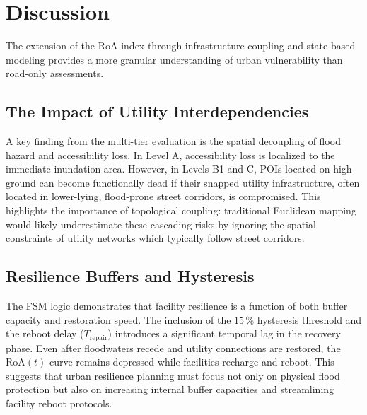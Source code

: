 
\newpage

\section{Discussion}
\label{sec:discussion}


The extension of the RoA index through infrastructure coupling and state-based modeling provides a more granular understanding of urban vulnerability than road-only assessments.

\subsection{The Impact of Utility Interdependencies}
\label{subsec:the-impact-of-utility-interdependencies}

A key finding from the multi-tier evaluation is the spatial decoupling of flood hazard and accessibility loss.
In Level A, accessibility loss is localized to the immediate inundation area.
However, in Levels B1 and C, POIs located on high ground can become functionally dead if their snapped utility infrastructure, often located in lower-lying, flood-prone street corridors, is compromised.
This highlights the importance of topological coupling: traditional Euclidean mapping would likely underestimate these cascading risks by ignoring the spatial constraints of utility networks which typically follow street corridors.

\subsection{Resilience Buffers and Hysteresis}
\label{subsec:resilience-buffers-and-hysteresis}

The FSM logic demonstrates that facility resilience is a function of both buffer capacity and restoration speed.
The inclusion of the $15\,\%$ hysteresis threshold and the reboot delay ($T_{\text{repair}}$) introduces a significant temporal lag in the recovery phase.
Even after floodwaters recede and utility connections are restored, the $\text{RoA}(t)$ curve remains depressed while facilities recharge and reboot.
This suggests that urban resilience planning must focus not only on physical flood protection but also on increasing internal buffer capacities and streamlining facility reboot protocols.

